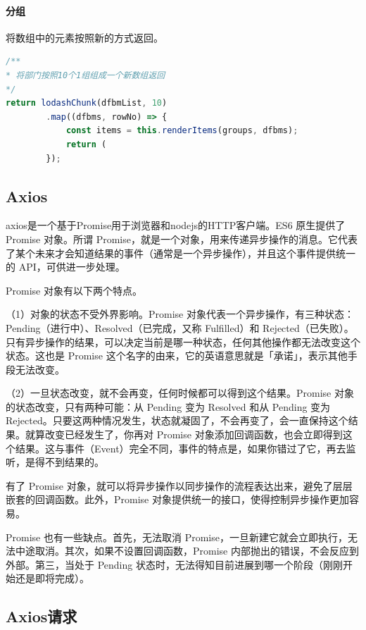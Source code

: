 \documentclass[letter]{book}
\begin{document}
\paragraph{分组}

将数组中的元素按照新的方式返回。

\begin{lstlisting}[language=JavaScript]
/**
* 将部门按照10个1组组成一个新数组返回
*/
return lodashChunk(dfbmList, 10)
		.map((dfbms, rowNo) => {
			const items = this.renderItems(groups, dfbms);
			return (
		});
\end{lstlisting}


\subsection{Axios}

axios是一个基于Promise用于浏览器和nodejs的HTTP客户端。ES6 原生提供了 Promise 对象。所谓 Promise，就是一个对象，用来传递异步操作的消息。它代表了某个未来才会知道结果的事件（通常是一个异步操作），并且这个事件提供统一的 API，可供进一步处理。

Promise 对象有以下两个特点。

（1）对象的状态不受外界影响。Promise 对象代表一个异步操作，有三种状态：Pending（进行中）、Resolved（已完成，又称 Fulfilled）和 Rejected（已失败）。只有异步操作的结果，可以决定当前是哪一种状态，任何其他操作都无法改变这个状态。这也是 Promise 这个名字的由来，它的英语意思就是「承诺」，表示其他手段无法改变。

（2）一旦状态改变，就不会再变，任何时候都可以得到这个结果。Promise 对象的状态改变，只有两种可能：从 Pending 变为 Resolved 和从 Pending 变为 Rejected。只要这两种情况发生，状态就凝固了，不会再变了，会一直保持这个结果。就算改变已经发生了，你再对 Promise 对象添加回调函数，也会立即得到这个结果。这与事件（Event）完全不同，事件的特点是，如果你错过了它，再去监听，是得不到结果的。

有了 Promise 对象，就可以将异步操作以同步操作的流程表达出来，避免了层层嵌套的回调函数。此外，Promise 对象提供统一的接口，使得控制异步操作更加容易。

Promise 也有一些缺点。首先，无法取消 Promise，一旦新建它就会立即执行，无法中途取消。其次，如果不设置回调函数，Promise 内部抛出的错误，不会反应到外部。第三，当处于 Pending 状态时，无法得知目前进展到哪一个阶段（刚刚开始还是即将完成）。

\subsection{Axios请求}
\end{document}
